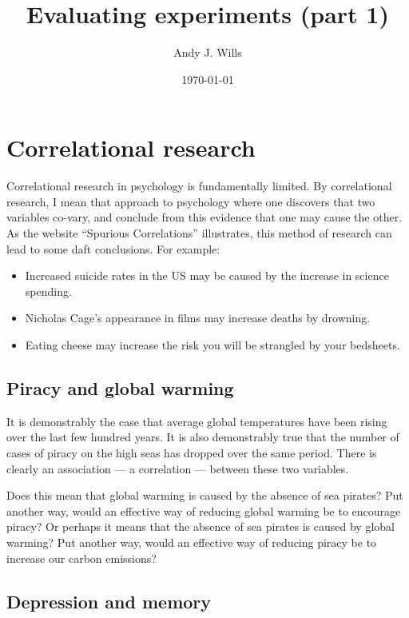 \documentclass[12pt]{article}
\begin{document}
	\title{Evaluating experiments (part 1)}
	\date{\today}
	\author{Andy J. Wills}
	\maketitle

\section{Correlational research}

Correlational research in psychology is fundamentally limited. By
correlational research, I mean that approach to psychology where one
discovers that two variables co-vary, and conclude from this evidence
that one may cause the other. As the website ``Spurious Correlations''
illustrates, this method of research can lead to some daft
conclusions. For example:

\begin{itemize}
	\item Increased suicide rates in the US may be caused by the increase in science spending. 
	\item  Nicholas Cage's appearance in films may increase deaths by drowning.
	\item Eating cheese may increase the risk you will be strangled by your bedsheets.
\end{itemize}

\subsection{Piracy and global warming}

It is demonstrably the case that average global temperatures have been
rising over the last few hundred years. It is also demonstrably true
that the number of cases of piracy on the high seas has dropped over
the same period. There is clearly an association --- a correlation ---
between these two variables.

Does this mean that global warming is caused by the absence of sea
pirates? Put another way, would an effective way of reducing global
warming be to encourage piracy? Or perhaps it means that the absence
of sea pirates is caused by global warming? Put another way, would an
effective way of reducing piracy be to increase our carbon emissions?

\subsection{Depression and memory}
\end{document}
